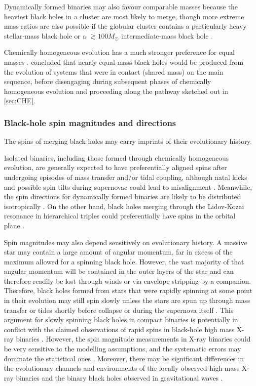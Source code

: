 \documentclass[review]{elsarticle}
\begin{document}
Dynamically formed binaries may also favour comparable masses because the heaviest black holes in a cluster are most likely to merge, though more extreme mass ratios are also possible if the globular cluster contains a particularly heavy stellar-mass black hole or a $\gtrsim 100 M_\odot$ intermediate-mass black hole \citep{Mandel:2008,Belczynski:2014VMS}. 

Chemically homogeneous evolution has a much stronger preference for equal masses \citep{MandeldeMink:2016}.  \citet{Marchant:2016} concluded that nearly equal-mass black holes would be produced from the evolution of systems that were in contact (shared mass) on the main sequence, before disengaging during subsequent phases of chemically homogeneous evolution and proceeding along the pathway sketched out in \autoref{sec:CHE}. 

\subsubsection{Black-hole spin magnitudes and directions}\label{BHspins}
The spins of merging black holes may carry imprints of their evolutionary history. 

Isolated binaries, including those formed through chemically homogeneous evolution, are generally expected to have preferentially aligned spins after undergoing episodes of mass transfer and/or tidal coupling, although natal kicks and possible spin tilts during supernovae could lead to misalignment \citep[e.g.,][]{Farr:2011,Tauris:2017}.  Meanwhile, the spin directions for dynamically formed binaries are likely to be distributed isotropically \citep[e.g.,][]{Rodriguez:2016spin}.  On the other hand, black holes merging through the Lidov-Kozai resonance in hierarchical triples could preferentially have spins in the orbital plane \citep{LiuLai:2018,RodriguezAntonini:2018}.

Spin magnitudes may also depend sensitively on evolutionary history.  A massive star may contain a large amount of angular momentum, far in excess of the maximum allowed for a spinning black hole. However, the vast majority of that angular momentum will be contained in the outer layers of the star and can therefore readily be lost through winds or via envelope stripping by a companion.  Therefore, black holes formed from stars that were rapidly spinning at some point in their evolution may still spin slowly unless the stars are spun up through mass transfer or tides shortly before collapse \citep{Kushnir:2016,HotokezakaPiran:2017,Zaldarriaga:2017} or during the supernova itself \citep{Batta:2017,Schroeder:2018}.   This argument for slowly spinning black holes in compact binaries is potentially in conflict with the claimed observations of rapid spins in black-hole high mass X-ray binaries \citep{MillerMiller:2015}.     However, the spin magnitude measurements in X-ray binaries could be very sensitive to the modelling assumptions, and the systematic errors may dominate the statistical ones \citep[e.g.,][]{Basak:2017,Kawano:2017}. Moreover, there may be significant differences in the evolutionary channels and environments of the locally observed high-mass X-ray binaries and the binary black holes observed in gravitational waves \citep[][and see \autoref{environ}]{HotokezakaPiran:2017}.
\end{document}
